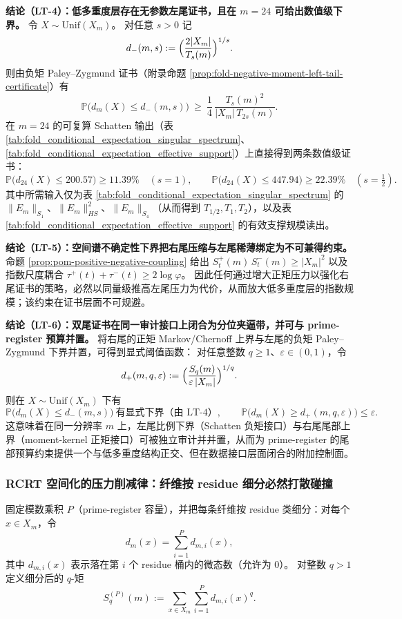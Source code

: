 \medskip\noindent\textbf{结论（LT-4）：低多重度层存在无参数左尾证书，且在 \(m=24\) 可给出数值级下界。}
令 \(X\sim \mathrm{Unif}(X_m)\)。
对任意 \(s>0\) 记
\[
d_{-}(m,s):=\Bigl(\frac{2|X_m|}{T_s(m)}\Bigr)^{1/s}.
\]
则由负矩 Paley--Zygmund 证书（附录命题 \ref{prop:fold-negative-moment-left-tail-certificate}）有
\[
\mathbb{P}\bigl(d_m(X)\le d_{-}(m,s)\bigr)\ \ge\ \frac14\,\frac{T_s(m)^2}{|X_m|\,T_{2s}(m)}.
\]
在 \(m=24\) 的可复算 Schatten 输出（表 \ref{tab:fold_conditional_expectation_singular_spectrum}、\ref{tab:fold_conditional_expectation_effective_support}）上直接得到两条数值级证书：
\[
\mathbb{P}\bigl(d_{24}(X)\le 200.57\bigr)\ge 11.39\% \quad(s=1),
\qquad
\mathbb{P}\bigl(d_{24}(X)\le 447.94\bigr)\ge 22.39\% \quad(s=\tfrac12).
\]
其中所需输入仅为表 \ref{tab:fold_conditional_expectation_singular_spectrum} 的 \(\|E_m\|_{S_1}\)、\(\|E_m\|_{HS}^2\)、\(\|E_m\|_{S_4}\)（从而得到 \(T_{1/2},T_1,T_2\)），以及表 \ref{tab:fold_conditional_expectation_effective_support} 的有效支撑规模读出。

\medskip\noindent\textbf{结论（LT-5）：空间谱不确定性下界把右尾压缩与左尾稀薄绑定为不可兼得约束。}
命题 \ref{prop:pom-positive-negative-coupling} 给出
\(
S_t^+(m)\,S_t^-(m)\ge |X_m|^2
\)
以及指数尺度耦合
\(
\tau^{+}(t)+\tau^{-}(t)\ge 2\log\varphi
\)。
因此任何通过增大正矩压力以强化右尾证书的策略，必然以同量级推高左尾压力为代价，从而放大低多重度层的指数规模；该约束在证书层面不可规避。

\medskip\noindent\textbf{结论（LT-6）：双尾证书在同一审计接口上闭合为分位夹逼带，并可与 prime-register 预算并置。}
将右尾的正矩 Markov/Chernoff 上界与左尾的负矩 Paley--Zygmund 下界并置，可得到显式阈值函数：
对任意整数 \(q\ge 1\)、\(\varepsilon\in(0,1)\)，令
\[
d_{+}(m,q,\varepsilon):=\Bigl(\frac{S_q(m)}{\varepsilon\,|X_m|}\Bigr)^{1/q}.
\]
则在 \(X\sim \mathrm{Unif}(X_m)\) 下有
\[
\mathbb{P}\bigl(d_m(X)\le d_{-}(m,s)\bigr)\ \text{有显式下界（由 LT-4）},
\qquad
\mathbb{P}\bigl(d_m(X)\ge d_{+}(m,q,\varepsilon)\bigr)\le \varepsilon.
\]
这意味着在同一分辨率 \(m\) 上，左尾比例下界（Schatten 负矩接口）与右尾尾部上界（moment-kernel 正矩接口）可被独立审计并并置，从而为 prime-register 的尾部预算约束提供一个与低多重度结构正交、但在数据接口层面闭合的附加控制面。

\subsubsection{RCRT 空间化的压力削减律：纤维按 residue 细分必然打散碰撞}\label{subsec:pom-rcrt-pressure-reduction}
\begin{definition}\label{def:pom-residue-refined-moment}
固定模数乘积 \(P\)（prime-register 容量），并把每条纤维按 residue 类细分：对每个 \(x\in X_m\)，令
$$
d_m(x)=\sum_{i=1}^{P} d_{m,i}(x),
$$
其中 \(d_{m,i}(x)\) 表示落在第 \(i\) 个 residue 桶内的微态数（允许为 \(0\)）。
对整数 \(q>1\) 定义细分后的 \(q\)-矩
$$
S_q^{(P)}(m):=\sum_{x\in X_m}\sum_{i=1}^{P} d_{m,i}(x)^q.
$$
\end{definition}

